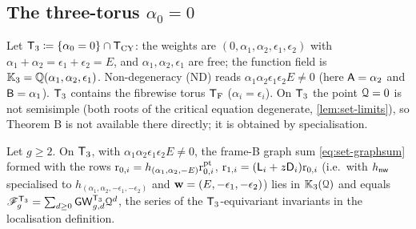 \subsection{The three-torus \texorpdfstring{$\alpha_0=0$}{alpha0 = 0}}

Let $\mathsf{T}_{3}\coloneqq\{\alpha_0=0\}\cap\mathsf{T}_{\mathrm{CY}}$: the weights are $(0,\alpha_1,\alpha_2,\epsilon_1,\epsilon_2)$ with $\alpha_1+\alpha_2=\epsilon_1+\epsilon_2=E$, and $\alpha_1,\alpha_2,\epsilon_1$ are free; the function field is $\mathbb{K}_{3}=\mathbb{Q}(\alpha_1,\alpha_2,\epsilon_1)$. Non-degeneracy (ND) reads $\alpha_1\alpha_2\epsilon_1\epsilon_2E\neq 0$ (here $\mathsf{A}=\alpha_2$ and $\mathsf{B}=\alpha_1$). $\mathsf{T}_{3}$ contains the fibrewise torus $\mathsf{T}_{\mathrm{F}}$ ($\alpha_i=\epsilon_i$). On $\mathsf{T}_{3}$ the point $\mathcal{Q}=0$ is not semisimple (both roots of the critical equation degenerate, \cref{lem:set-limits}), so Theorem B is not available there directly; it is obtained by specialisation.

\begin{lem}
\label{lem:rig-3Tid}
Let $g\geq 2$. On $\mathsf{T}_{3}$, with $\alpha_1\alpha_2\epsilon_1\epsilon_2E\neq 0$, the frame-B graph sum \eqref{eq:set-graphsum} formed with the rows $\mathrm{r}_{0,i}=h_{(\alpha_1,\alpha_2,-E)}\mathrm{r}^{\mathrm{pt}}_{0,i}$, $\mathrm{r}_{1,i}=(\mathsf{L}_i+z\mathsf{D}_i)\mathrm{r}_{0,i}$ (i.e.\ with $h_{\mathsf{nw}}$ specialised to $h_{(\alpha_1,\alpha_2,-\epsilon_1,-\epsilon_2)}$ and $\mathbf{w}=(E,-\epsilon_1,-\epsilon_2)$) lies in $\mathbb{K}_{3}(\mathcal{Q})$ and equals $\mathscr{F}^{\mathsf{T}_{3}}_g=\sum_{d\geq 0}\mathsf{GW}^{\mathsf{T}_{3}}_{g,d}\mathcal{Q}^d$, the series of the $\mathsf{T}_{3}$-equivariant invariants in the localisation definition.
\end{lem}

